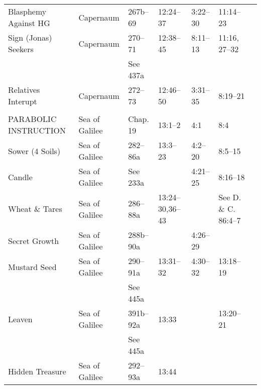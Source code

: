 \begin{longtable}[h]{l@{\hspace{0.5em}}l@{\hspace{0.5em}}l@{\hspace{0.5em}}BBBB}
Blasphemy Against HG                       & Capernaum           & 267b--69           & 12:24--37         & 3:22--30           & 11:14--23             & \\
Sign (Jonas) Seekers                       & Capernaum           & 270--71            & 12:38--45         & 8:11--13           & 11:16, 27--32         & \\
                                           &                     & See 437a           &                   &                    &                       & \\
Relatives Interupt                         & Capernaum           & 272--73            & 12:46--50         & 3:31--35           & 8:19--21              & \\
\\
PARABOLIC INSTRUCTION                      & Sea of Galilee      & Chap. 19           & 13:1--2           & 4:1                & 8:4                   & \\
\quad Sower (4 Soils)                      & Sea of Galilee      & 282--86a           & 13:3--23          & 4:2--20            & 8:5--15               & \\
\quad Candle                               & Sea of Galilee      & See 233a           &                   & 4:21--25           & 8:16--18              & \\
\quad Wheat \& Tares                       & Sea of Galilee      & 286--88a           & 13:24--30,36--43  &                    & See D. \& C. 86:4--7  & \\
\quad Secret Growth                        & Sea of Galilee      & 288b--90a          &                   & 4:26--29           &                       & \\
\quad Mustard Seed                         & Sea of Galilee      & 290--91a           & 13:31--32         & 4:30--32           & 13:18--19             & \\
                                           &                     & See 445a           &                   &                    &                       & \\
\quad Leaven                               & Sea of Galilee      & 391b--92a          & 13:33             &                    & 13:20--21             & \\
                                           &                     & See 445a           &                   &                    &                       & \\
\quad Hidden Treasure                      & Sea of Galilee      & 292--93a           & 13:44             &                    &                       & \\

\end{longtable}
